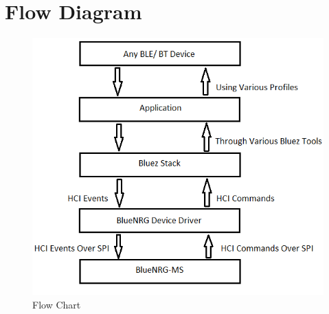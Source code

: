 \section{Flow Diagram}
\begin{figure}[ht]
	\centering
	\includegraphics[scale=0.5]{images/flow_chart.png}
	\caption{Flow Chart}
\end{figure}
